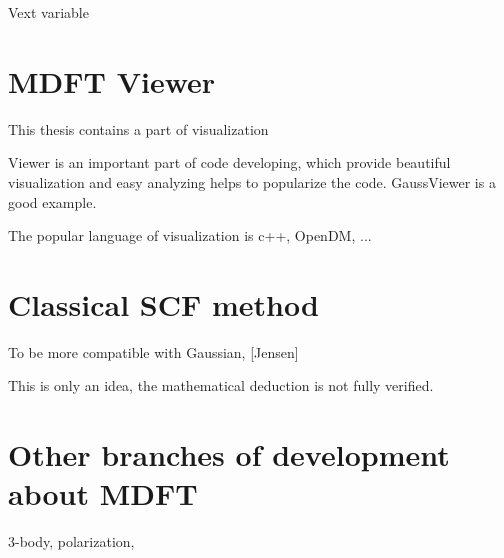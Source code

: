 Vext variable

\section{MDFT Viewer}

This thesis contains a part of visualization

Viewer is an important part of code developing, which provide beautiful
visualization and easy analyzing helps to popularize the code. GaussViewer
is a good example.

The popular language of visualization is c++, OpenDM, ...

\section{Classical SCF method}

To be more compatible with Gaussian, {[}Jensen{]}

This is only an idea, the mathematical deduction is not fully verified.

\section{Other branches of development about MDFT}

3-body, polarization, 
